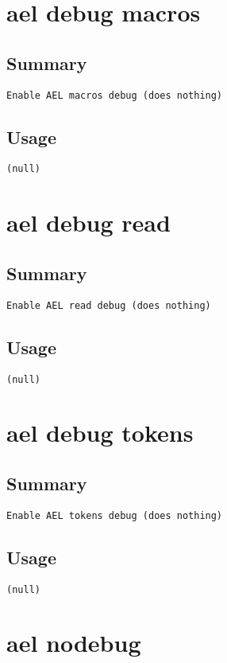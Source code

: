\section{ael debug macros}
\subsection{Summary}
\begin{verbatim}
Enable AEL macros debug (does nothing)
\end{verbatim}
\subsection{Usage}
\begin{verbatim}
(null)
\end{verbatim}


\section{ael debug read}
\subsection{Summary}
\begin{verbatim}
Enable AEL read debug (does nothing)
\end{verbatim}
\subsection{Usage}
\begin{verbatim}
(null)
\end{verbatim}


\section{ael debug tokens}
\subsection{Summary}
\begin{verbatim}
Enable AEL tokens debug (does nothing)
\end{verbatim}
\subsection{Usage}
\begin{verbatim}
(null)
\end{verbatim}


\section{ael nodebug}
